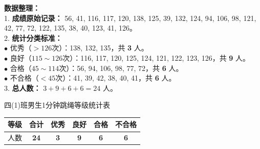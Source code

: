 \vspace{0.4cm}

{\small
\textbf{数据整理：} \\
1. \textbf{成绩原始记录：} 56, 41, 116, 117, 120, 138, 125, 39, 132, 124, 94, 106, 98, 121, 42, 77, 72, 122, 135, 38, 40, 123, 41, 126。 \\
2. \textbf{统计分类标准：} \\
   $\bullet$ 优秀（$>126$次）：138, 132, 135，共 \textbf{3} 人。 \\
   $\bullet$ 良好（$115 \sim 126$次）：116, 117, 120, 125, 124, 121, 122, 123, 126，共 \textbf{9} 人。 \\
   $\bullet$ 合格（$45 \sim 114$次）：56, 94, 106, 98, 77, 72，共 \textbf{6} 人。 \\
   $\bullet$ 不合格（$<45$次）：41, 39, 42, 38, 40, 41，共 \textbf{6} 人。 \\
3. \textbf{总人数：} $3 + 9 + 6 + 6 = 24$ 人。
}

\vspace{0.6cm}

\begin{center}
  {\small 四(1)班男生1分钟跳绳等级统计表} \\
  \vspace{0.2cm}
  \renewcommand{\arraystretch}{1.5}
  \begin{tabular}{|c|c|c|c|c|c|}
    \hline
    等级 & 合计 & 优秀 & 良好 & 合格 & 不合格 \\
    \hline
    人数 & \textbf{\textcolor{red!70!black}{24}} & \textbf{\textcolor{red!70!black}{3}} & \textbf{\textcolor{red!70!black}{9}} & \textbf{\textcolor{red!70!black}{6}} & \textbf{\textcolor{red!70!black}{6}} \\
    \hline
  \end{tabular}
\end{center}

\vspace{0.8cm}

